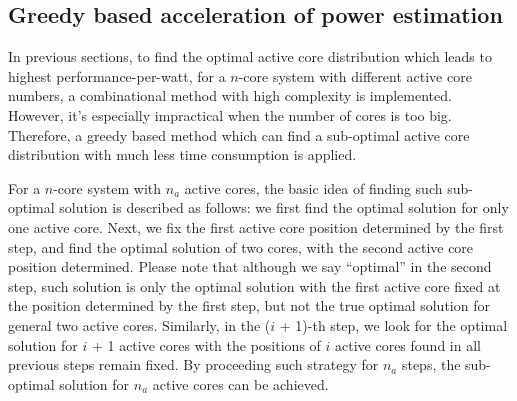 \subsection{Greedy based acceleration of power estimation}
In previous sections, to find the optimal active core distribution which leads to highest performance-per-watt, for a $n$-core system with different active core numbers,  a combinational method with high complexity is implemented. However, it's  especially impractical when the number of cores is too big. Therefore, a greedy based method which can find a sub-optimal active core distribution with much less time consumption is applied.

For a $n$-core system with $n_{a}$ active cores, the basic idea of finding such sub-optimal solution is described as follows: we first find the optimal solution for only one active core. Next, we fix the first active core position determined by the first step, and find the optimal solution of two cores, with the second active core position determined. Please note that although we say “optimal” in the second step, such solution is only the optimal solution with the first active core fixed at the position determined by the first step, but not the true optimal solution for general two active cores. Similarly, in the ($i$ + 1)-th step, we look for the optimal solution for $i$ + 1 active cores with the positions of $i$ active cores found in all previous steps remain fixed. By proceeding such strategy for $n_{a}$ steps, the sub-optimal solution for $n_{a}$ active cores can be achieved.

